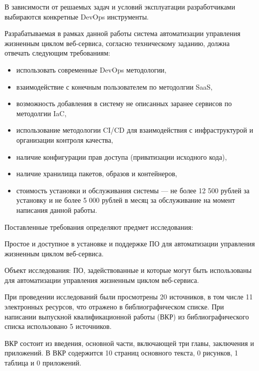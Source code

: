В зависимости от решаемых задач и условий эксплуатации разработчиками выбираются конкретные DevOps инструменты.

Разрабатываемая в рамках данной работы система автоматизации управления жизненным циклом веб-сервиса,
согласно техническому заданию, должна отвечать следующим требованиям:

\begin{itemize}
    \item использовать современные DevOps методологии,
    \item взаимодействие с конечным пользователем по методолгии SaaS,
    \item возможность добавления в систему не описанных заранее сервисов по методолгии IaC,
    \item использование методологии CI/CD для взаимодействия с инфраструктурой и организации контроля качества,
    \item наличие конфигурации прав доступа (приватизации исходного кода),
    \item наличие хранилища пакетов, образов и контейнеров,
    \item стоимость установки и обслуживания системы --- не более 12 500 рублей за установку и не более 5 000 рублей в месяц за обслуживание на момент написания данной работы.
\end{itemize}

Поставленные требования определяют предмет исследования:

Простое и доступное в установке и поддержке ПО для автоматизации управления жизненным циклом веб-сервиса\cite{vkrsen}.

Объект исследования: ПО, задействованные и которые могут быть использованы для автоматизации управления жизненным циклом веб-сервиса.

При проведении исследований были просмотрены 20 источников, в том числе 11 электронных ресурсов, что отражено в библиографическом списке.
При написании выпускной квалификационной работы (ВКР) из библиографического списка использовано 5 источников.

ВКР состоит из введения, основной части, включающей три главы, заключения и приложений.
В ВКР содержится 10 страниц основного текста, 0 рисунков, 1 таблица и 0 приложений.